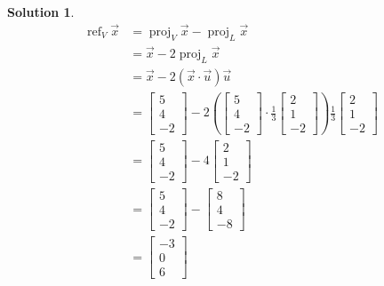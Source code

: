 \documentclass{article}
\newtheorem*{solution}{Solution}
\DeclareMathOperator{\proj}{proj}
\DeclareMathOperator{\refl}{ref}
\newcommand{\vectorproj}[2][]{\proj_{#1}#2}
\newcommand{\vectorrefl}[2][]{\refl_{#1}#2}
\begin{document}
\begin{solution}
\begin{align*}
\vectorrefl[V]{\vec{x}} &= \vectorproj[V]{\vec{x}} - \vectorproj[L]{\vec{x}} \\
&= \vec{x} - 2\vectorproj[L]{\vec{x}} \\
&= \vec{x} - 2(\vec{x} \cdot \vec{u}) \vec{u} \\
&= \begin{bmatrix} 5 \\ 4 \\ -2 \end{bmatrix} - 2\left(\begin{bmatrix} 5 \\ 4 \\ -2 \end{bmatrix} \cdot \frac{1}{3} \begin{bmatrix} 2 \\ 1 \\ -2 \end{bmatrix}\right) \frac{1}{3} \begin{bmatrix} 2 \\ 1 \\ -2 \end{bmatrix} \\
&= \begin{bmatrix} 5 \\ 4 \\ -2 \end{bmatrix} - 4 \begin{bmatrix} 2 \\ 1 \\ -2 \end{bmatrix} \\
&= \begin{bmatrix} 5 \\ 4 \\ -2 \end{bmatrix} - \begin{bmatrix} 8 \\ 4 \\ -8 \end{bmatrix} \\
&= \begin{bmatrix} -3 \\ 0 \\ 6 \end{bmatrix} 
\end{align*}
\end{solution}
\end{document}
